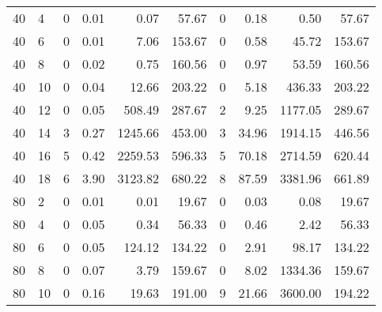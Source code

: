 \begin{appendices}
\begin{table*}[h]
\begin{center}
\begin{tabular} {l l | r r r r | r r r r}
40 & 4                                  &   0             & 0.01          &  0.07       &  57.67       &  0            &  0.18    &  0.50       &  57.67            \\ 
40 & 6                                  &   0             & 0.01          &  7.06       &  153.67      &  0            &  0.58    &  45.72      &  153.67           \\ 
40 & 8                                  &   0             & 0.02          &  0.75       &  160.56      &  0            &  0.97    &  53.59      &  160.56           \\ 
40 & 10                                 &   0             & 0.04          &  12.66      &  203.22      &  0            &  5.18    &  436.33     &  203.22           \\ 
40 & 12                                 &   0             & 0.05          &  508.49     &  287.67      &  2            &  9.25    &  1177.05    &  289.67           \\ 
40 & 14                                 &   3             & 0.27          &  1245.66    &  453.00      &  3            &  34.96   &  1914.15    &  446.56           \\ 
40 & 16                                 &   5             & 0.42          &  2259.53    &  596.33      &  5            &  70.18   &  2714.59    &  620.44           \\ 
40 & 18                                 &   6             & 3.90          &  3123.82    &  680.22      &  8            &  87.59   &  3381.96    &  661.89           \\ 
80 & 2                                  &   0             & 0.01          &  0.01       &  19.67       &  0            &  0.03    &  0.08       &  19.67            \\ 
80 & 4                                  &   0             & 0.05          &  0.34       &  56.33       &  0            &  0.46    &  2.42       &  56.33            \\ 
80 & 6                                  &   0             & 0.05          &  124.12     &  134.22      &  0            &  2.91    &  98.17      &  134.22           \\ 
80 & 8                                  &   0             & 0.07          &  3.79       &  159.67      &  0            &  8.02    &  1334.36    &  159.67           \\ 
80 & 10                                 &   0             & 0.16          &  19.63      &  191.00      &  9            &  21.66   &  3600.00    &  194.22           \\ 

\end{tabular}
\end{center}
\end{table*}
\end{appendices}
